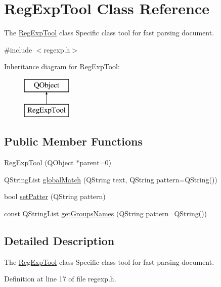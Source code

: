 \hypertarget{class_reg_exp_tool}{}\section{Reg\+Exp\+Tool Class Reference}
\label{class_reg_exp_tool}


The \hyperlink{class_reg_exp_tool}{Reg\+Exp\+Tool} class Specific class tool for fast parsing document.  




{\ttfamily \#include $<$regexp.\+h$>$}

Inheritance diagram for Reg\+Exp\+Tool\+:\begin{figure}[H]
\begin{center}
\leavevmode
\includegraphics[height=2.000000cm]{class_reg_exp_tool}
\end{center}
\end{figure}
\subsection*{Public Member Functions}
\begin{DoxyCompactItemize}
\item 
\hyperlink{class_reg_exp_tool_a08defd4a7b37e54d7278cb0e25b03922}{Reg\+Exp\+Tool} (Q\+Object $\ast$parent=0)
\item 
Q\+String\+List \hyperlink{class_reg_exp_tool_a15bf497425b5baaebf81697af4e59ad2}{global\+Match} (Q\+String text, Q\+String pattern=Q\+String())
\item 
bool \hyperlink{class_reg_exp_tool_a91de829aa5c85a794348421a28b4b73c}{set\+Patter} (Q\+String pattern)
\item 
const Q\+String\+List \hyperlink{class_reg_exp_tool_a4db3c1e4ddabf6246d41be920f60b7be}{get\+Groups\+Names} (Q\+String pattern=Q\+String())
\end{DoxyCompactItemize}


\subsection{Detailed Description}
The \hyperlink{class_reg_exp_tool}{Reg\+Exp\+Tool} class Specific class tool for fast parsing document. 

Definition at line 17 of file regexp.\+h.



